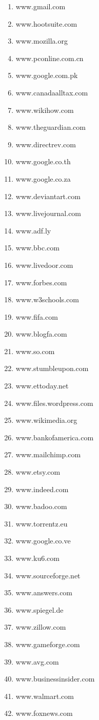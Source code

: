 \begin{enumerate}
\item www.gmail.com
\item www.hootsuite.com
\item www.mozilla.org
\item www.pconline.com.cn
\item www.google.com.pk
\item www.canadaalltax.com
\item www.wikihow.com
\item www.theguardian.com
\item www.directrev.com
\item www.google.co.th
\item www.google.co.za
\item www.deviantart.com
\item www.livejournal.com
\item www.adf.ly
\item www.bbc.com
\item www.livedoor.com
\item www.forbes.com
\item www.w3schools.com
\item www.fifa.com
\item www.blogfa.com
\item www.so.com
\item www.stumbleupon.com
\item www.ettoday.net
\item www.files.wordpress.com
\item www.wikimedia.org
\item www.bankofamerica.com
\item www.mailchimp.com
\item www.etsy.com
\item www.indeed.com
\item www.badoo.com
\item www.torrentz.eu
\item www.google.co.ve
\item www.ku6.com
\item www.sourceforge.net
\item www.answers.com
\item www.spiegel.de
\item www.zillow.com
\item www.gameforge.com
\item www.avg.com
\item www.businessinsider.com
\item www.walmart.com
\item www.foxnews.com

\end{enumerate}
